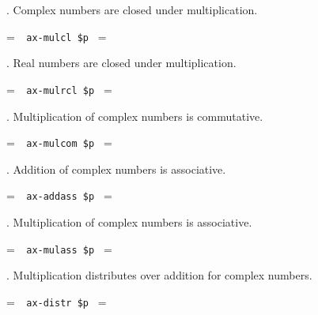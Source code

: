 . Complex numbers are closed under multiplication.

\setbox\startprefix=\hbox{\tt \ \ ax-mulcl\ \$p\ }
\setbox\contprefix=\hbox{\tt \ \ \ \ \ \ \ \ \ \ \ \ \ }
\startm
\m{\vdash}\m{(}\m{(}\m{\in}\m{\wedge}\m{\in}%
\m{)}\m{\rightarrow}\m{(}\m{\cdot}\m{)}\m{\in}\m{)}
\endm

. Real numbers are closed under multiplication.

\setbox\startprefix=\hbox{\tt \ \ ax-mulrcl\ \$p\ }
\setbox\contprefix=\hbox{\tt \ \ \ \ \ \ \ \ \ \ \ \ \ \ }
\startm
\m{\vdash}\m{(}\m{(}\m{\in}\m{\wedge}\m{\in}%
\m{)}\m{\rightarrow}\m{(}\m{\cdot}\m{)}\m{\in}\m{)}
\endm

. Multiplication of complex numbers is commutative.

\setbox\startprefix=\hbox{\tt \ \ ax-mulcom\ \$p\ }
\setbox\contprefix=\hbox{\tt \ \ \ \ \ \ \ \ \ \ \ \ \ \ }
\startm
\m{\vdash}\m{(}\m{(}\m{\in}\m{\wedge}\m{\in}%
\m{)}\m{\rightarrow}\m{(}\m{\cdot}\m{)}\m{=}\m{(}\m{\cdot}%
\m{)}\m{)}
\endm

. Addition of complex numbers is associative.

\setbox\startprefix=\hbox{\tt \ \ ax-addass\ \$p\ }
\setbox\contprefix=\hbox{\tt \ \ \ \ \ \ \ \ \ \ \ \ \ \ }
\startm
\m{\vdash}\m{(}\m{(}\m{\in}\m{\wedge}\m{\in}%
\m{\wedge}\m{\in}\m{)}\m{\rightarrow}\m{(}\m{(}\m{+}%
\m{)}\m{+}\m{)}\m{=}\m{(}\m{+}\m{(}\m{+}\m{)}\m{)}%
\m{)}
\endm

. Multiplication of complex numbers is associative.

\setbox\startprefix=\hbox{\tt \ \ ax-mulass\ \$p\ }
\setbox\contprefix=\hbox{\tt \ \ \ \ \ \ \ \ \ \ \ \ \ \ }
\startm
\m{\vdash}\m{(}\m{(}\m{\in}\m{\wedge}\m{\in}%
\m{\wedge}\m{\in}\m{)}\m{\rightarrow}\m{(}\m{(}\m{\cdot}%
\m{)}\m{\cdot}\m{)}\m{=}\m{(}\m{\cdot}\m{(}\m{\cdot}%
\m{)}\m{)}\m{)}
\endm

. Multiplication distributes over addition for complex numbers.

\setbox\startprefix=\hbox{\tt \ \ ax-distr\ \$p\ }
\setbox\contprefix=\hbox{\tt \ \ \ \ \ \ \ \ \ \ \ \ \ }
\startm
\m{\vdash}\m{(}\m{(}\m{\in}\m{\wedge}\m{\in}%
\m{\wedge}\m{\in}\m{)}\m{\rightarrow}\m{(}\m{\cdot}\m{(}%
\m{+}\m{)}\m{)}\m{=}\m{(}\m{(}\m{\cdot}\m{)}\m{+}\m{(}%
\m{\cdot}\m{)}\m{)}\m{)}
\endm

